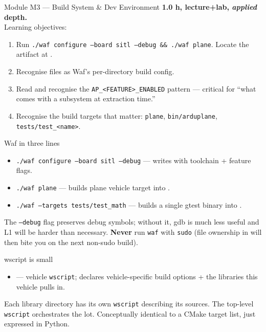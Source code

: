 \documentclass[aspectratio=169,11pt]{beamer}
\begin{document}
\begin{frame}{Module M3 --- Build System \& Dev Environment}
  \textbf{1.0 h, lecture+lab, \emph{applied} depth.}\\[1ex]
  Learning objectives:
  \begin{enumerate}
    \item Run \texttt{./waf configure --board sitl --debug \&\& ./waf plane}. Locate the artifact at .
    \item Recognise  files as Waf's per-directory build config.
    \item Read  and recognise the \texttt{AP\_<FEATURE>\_ENABLED} pattern --- critical for ``what comes with a subsystem at extraction time.''
    \item Recognise the build targets that matter: \texttt{plane}, \texttt{bin/arduplane}, \texttt{tests/test\_<name>}.
  \end{enumerate}
\end{frame}

\begin{frame}{Waf in three lines}
  \begin{itemize}
    \item \texttt{./waf configure --board sitl --debug} --- writes  with toolchain + feature flags.
    \item \texttt{./waf plane} --- builds plane vehicle target into .
    \item \texttt{./waf --targets tests/test\_math} --- builds a single gtest binary into .
  \end{itemize}
  \vfill
  The \texttt{--debug} flag preserves debug symbols; without it, gdb is much less useful and L1 will be harder than necessary.
  \vfill
  \textbf{Never} run \texttt{waf} with \texttt{sudo} (file ownership in  will then bite you on the next non-sudo build).
\end{frame}

\begin{frame}{wscript is small}
  \begin{itemize}
    \item {} --- vehicle \texttt{wscript}; declares vehicle-specific build options + the libraries this vehicle pulls in.
  \end{itemize}
  \vfill
  Each library directory has its own \texttt{wscript} describing its sources. The top-level \texttt{wscript} orchestrates the lot.
  \vfill
  Conceptually identical to a CMake target list, just expressed in Python.
\end{frame}
\end{document}
